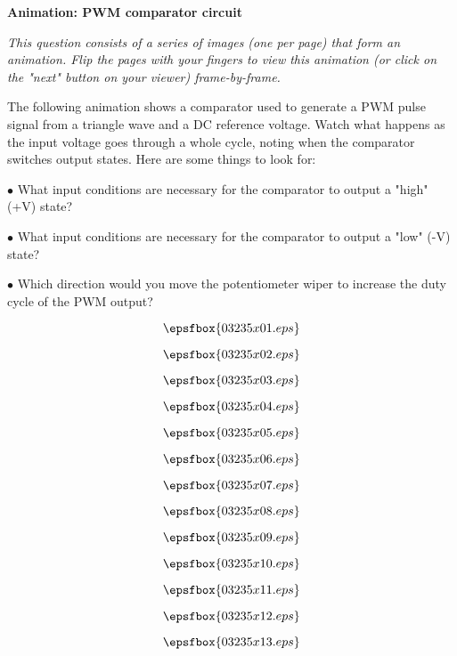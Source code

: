 

\centerline{\bf Animation: PWM comparator circuit}

\vskip 10pt

{\it This question consists of a series of images (one per page) that form an animation.  Flip the pages with your fingers to view this animation (or click on the "next" button on your viewer) frame-by-frame.}

\vskip 10pt

The following animation shows a comparator used to generate a PWM pulse signal from a triangle wave and a DC reference voltage.  Watch what happens as the input voltage goes through a whole cycle, noting when the comparator switches output states.  Here are some things to look for:

\medskip
\goodbreak
\item{$\bullet$} What input conditions are necessary for the comparator to output a "high" (+V) state?
\item{$\bullet$} What input conditions are necessary for the comparator to output a "low" (-V) state?
\item{$\bullet$} Which direction would you move the potentiometer wiper to increase the duty cycle of the PWM output?
\medskip

\vfil \eject
$$\epsfbox{03235x01.eps}$$

\vfil \eject
$$\epsfbox{03235x02.eps}$$

\vfil \eject
$$\epsfbox{03235x03.eps}$$

\vfil \eject
$$\epsfbox{03235x04.eps}$$

\vfil \eject
$$\epsfbox{03235x05.eps}$$

\vfil \eject
$$\epsfbox{03235x06.eps}$$

\vfil \eject
$$\epsfbox{03235x07.eps}$$

\vfil \eject
$$\epsfbox{03235x08.eps}$$

\vfil \eject
$$\epsfbox{03235x09.eps}$$

\vfil \eject
$$\epsfbox{03235x10.eps}$$

\vfil \eject
$$\epsfbox{03235x11.eps}$$

\vfil \eject
$$\epsfbox{03235x12.eps}$$

\vfil \eject
$$\epsfbox{03235x13.eps}$$


